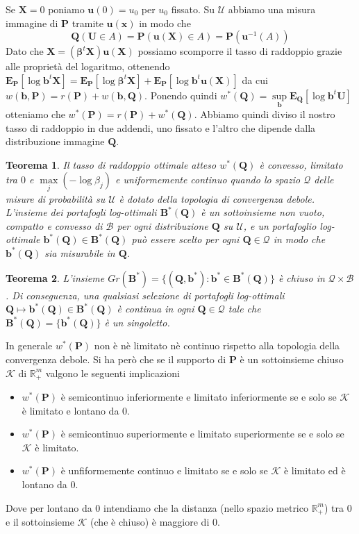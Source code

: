 \documentclass[a4paper,11pt]{book}
\theoremstyle{plain}
\newtheorem{teo}{Teorema}[chapter]
\theoremstyle{definition}
\theoremstyle{remark}
\newcommand{\R}{\mathbb{R}}
\newcommand{\X}{\bm{X}}
\newcommand{\x}{\bm{x}}
\newcommand{\B}{\bm{b}}
\newcommand{\Pro}{\mathbf{P}}
\newcommand{\E}{\mathbf{E}}
\begin{document}
Se $\X = 0$ poniamo $\bm{u}(0)=u_0$ per $u_0$ fissato. Su $\mathcal{U}$ abbiamo una misura immagine di $\Pro$ tramite $\bm{u(\x)}$ in modo che
\begin{equation*}
	\mathbf{Q}(\bm{U}\in A)=\Pro(\bm{u}(\X)\in A) = \Pro(\bm{u}^{-1}(A))
\end{equation*}
Dato che $\X=(\bm{\beta}^t\X)\bm{u}(\X)$ possiamo scomporre il tasso di raddoppio grazie alle proprietà del logaritmo, ottenendo
$\E_\Pro[\log\B^t\X]=\E_\Pro[\log\bm{\beta}^t\X]+\E_\Pro[\log\B^t\bm{u}(\X)]$ da cui $w(\B,\Pro)=r(\Pro)+w(\B,\mathbf{Q})$. Ponendo quindi $w^*(\mathbf{Q})=\sup\limits_{\bm{b}}\E_\mathbf{Q}[\log\B^t\bm{U}]$ otteniamo che $w^*(\Pro)=r(\Pro)+w^*(\mathbf{Q})$. Abbiamo quindi diviso il nostro tasso di raddoppio in due addendi, uno fissato e l'altro che dipende dalla distribuzione immagine $\mathbf{Q}$.
\begin{teo}
	Il tasso di raddoppio ottimale atteso $w^*(\mathbf{Q})$ è convesso, limitato tra $0$ e $\max\limits_j(-\log \beta_j)$ e uniformemente continuo quando lo spazio $\mathcal{Q}$ delle misure di probabilità su $\mathcal{U}$ è dotato della topologia di convergenza debole. L'insieme dei portafogli log-ottimali $\bm{B}^*(\mathbf{Q})$ è un sottoinsieme non vuoto, compatto e convesso di $\mathcal{B}$ per ogni distribuzione $\mathbf{Q}$ su $\mathcal{U}$, e un portafoglio log-ottimale $\B^*(\mathbf{Q})\in \bm{B}^*(\mathbf{Q})$ può essere scelto per ogni $\mathbf{Q}\in\mathcal{Q}$ in modo che $\B^*(\mathbf{Q})$ sia misurabile in $\mathbf{Q}$.
\end{teo}
\begin{teo}
	L'insieme $Gr(\bm{B}^*)=\{(\mathbf{Q},\B^*):\B^*\in\bm{B}^*(\mathbf{Q})\}$ è chiuso in $\mathcal{Q}\times\mathcal{B}$. Di conseguenza, una qualsiasi selezione di portafogli log-ottimali $\mathbf{Q}\mapsto \B^*(\mathbf{Q})\in\bm{B}^*(\mathbf{Q})$ è continua in ogni $\mathbf{Q}\in\mathcal{Q}$ tale che $\bm{B}^*(\mathbf{Q})=\{\B^*(\mathbf{Q})\}$ è un singoletto.
\end{teo}
In generale $w^*(\Pro)$ non è nè limitato nè continuo rispetto alla topologia della convergenza debole. Si ha però che se il supporto di $\Pro$ è un sottoinsieme chiuso $\mathcal{K}$ di $\R_+^m$ valgono le seguenti implicazioni
\begin{itemize}
	\item $w^*(\Pro)$ è semicontinuo inferiormente e limitato inferiormente se e solo se $\mathcal{K}$ è limitato e lontano da $0$.
	\item $w^*(\Pro)$ è semicontinuo superiormente e limitato superiormente se e solo se $\mathcal{K}$ è limitato.
	\item $w^*(\Pro)$ è unfiformemente continuo e limitato se e solo se $\mathcal{K}$ è limitato ed è lontano da $0$.
\end{itemize}
Dove per lontano da $0$ intendiamo che la distanza (nello spazio metrico $\R^m_+$) tra $0$ e il sottoinsieme $\mathcal{K}$ (che è chiuso) è maggiore di $0$.
\end{document}
